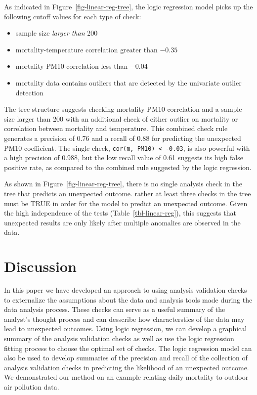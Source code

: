 \documentclass[
  12pt,
]{interact}
\providecommand{\tightlist}{%
  \setlength{\itemsep}{0pt}\setlength{\parskip}{0pt}}\usepackage{longtable,booktabs,array}
\begin{document}
As indicated in Figure~\ref{fig-linear-reg-tree}, the logic regression
model picks up the following cutoff values for each type of check:

\begin{itemize}
\tightlist
\item
  sample size \emph{larger than} 200
\item
  mortality-temperature correlation greater than \(-0.35\)
\item
  mortality-PM10 correlation less than \(-0.04\)
\item
  mortality data contains outliers that are detected by the univariate
  outlier detection
\end{itemize}

The tree structure suggests checking mortality-PM10 correlation and a
sample size larger than 200 with an additional check of either outlier
on mortality or correlation between mortality and temperature. This
combined check rule generates a precision of 0.76 and a recall of 0.88
for predicting the unexpected PM10 coefficient. The single check,
\texttt{cor(m,\ PM10)\ \textless{}\ -0.03}, is also powerful with a high
precision of 0.988, but the low recall value of 0.61 suggests its high
false positive rate, as compared to the combined rule suggested by the
logic regression.

As shown in Figure~\ref{fig-linear-reg-tree}, there is no single
analysis check in the tree that predicts an unexpected outcome. rather
at least three checks in the tree must be TRUE in order for the model to
predict an unexpected outcome. Given the high independence of the tests
(Table~\ref{tbl-linear-reg}), this suggests that unexpected results are
only likely after multiple anomalies are observed in the data.

\section{Discussion}\label{sec-discussion}

In this paper we have developed an approach to using analysis validation
checks to externalize the assumptions about the data and analysis tools
made during the data analysis process. These checks can serve as a
useful summary of the analyst's thought process and can desscribe how
characterstics of the data may lead to unexpected outcomes. Using logic
regression, we can develop a graphical summary of the analysis
validation checks as well as use the logic regression fitting process to
choose the optimal set of checks. The logic regression model can also be
used to develop summaries of the precision and recall of the collection
of analysis validation checks in predicting the likelihood of an
unexpected outcome. We demonstrated our method on an example relating
daily mortality to outdoor air pollution data.
\end{document}
